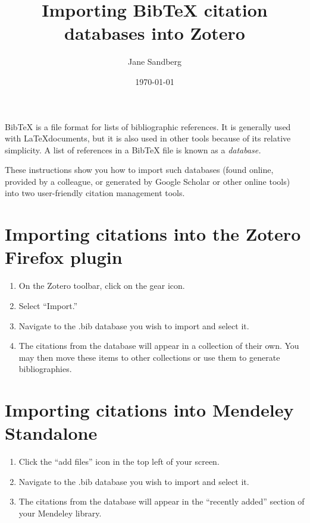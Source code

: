 \documentclass[11pt,a4paper]{article}
\title{Importing BibTeX citation databases into Zotero}
\author{Jane Sandberg}
\date{\today}
\begin{document}
\maketitle

BibTeX is a file format for lists of bibliographic references.  It is generally used with \LaTeX documents, but it is also used in other tools because of its relative simplicity.  A list of references in a BibTeX file is known as a \emph{database.}

These instructions show you how to import such databases (found online, provided by a colleague, or generated by Google Scholar or other online tools) into two user-friendly citation management tools.

\section*{Importing citations into the Zotero Firefox plugin}
\begin{enumerate}
\item On the Zotero toolbar, click on the gear icon.
\item Select ``Import.''
\item Navigate to the .bib database you wish to import and select it.
\item The citations from the database will appear in a collection of their own.  You may then move these items to other collections or use them to generate bibliographies.
\end{enumerate}


\section*{Importing citations into Mendeley Standalone}
\begin{enumerate}
\item Click the ``add files'' icon in the top left of your screen.
\item Navigate to the .bib database you wish to import and select it.
\item The citations from the database will appear in the ``recently added'' section of your Mendeley library.
\end{enumerate}
\end{document}
